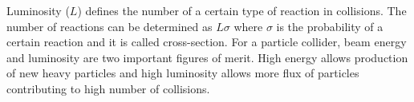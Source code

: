 Luminosity ($L$) defines the number of a certain type of reaction in collisions. The number of reactions can be determined as $L\sigma$ where $\sigma$ is the 
probability of a certain reaction and it is called cross-section. For a particle collider, beam energy and luminosity are two important figures of merit. High energy
allows production of new heavy particles and high luminosity allows more flux of particles contributing to high number of collisions. 